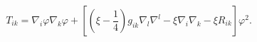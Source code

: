 \begin{equation}
T_{ik}=\nabla _{i}\varphi \nabla _{k}\varphi +\left[ \left( \xi -\frac{1}{4}%
\right) g_{ik}\nabla _{l}\nabla ^{l}-\xi \nabla _{i}\nabla _{k}-\xi R_{ik}%
\right] \varphi ^{2}.  \label{mTik}
\end{equation}

